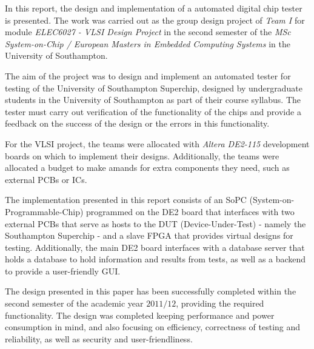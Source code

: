 In this report, the design and implementation of a automated digital chip tester is presented. The work was carried out as the group design project of \textit{Team I} for module \emph{ELEC6027 - VLSI Design Project} in the second semester of the \textit{MSc System-on-Chip / European Masters in Embedded Computing Systems} in the University of Southampton.

The aim of the project was to design and implement an automated tester for testing of the University of Southampton Superchip, designed by undergraduate students in the University of Southampton as part of their course syllabus. The tester must carry out verification of the functionality of the chips and provide a feedback on the success of the design or the errors in this functionality.

For the VLSI project, the teams were allocated with \textit{Altera DE2-115} development boards on which to implement their designs. Additionally, the teams were allocated a budget to make amands for extra components they need, such as external PCBs or ICs.

The implementation presented in this report consists of an SoPC (System-on-Programmable-Chip) programmed on the DE2 board that interfaces with two external PCBs that serve as hosts to the DUT (Device-Under-Test) - namely the Southampton Superchip - and a slave FPGA that provides virtual designs for testing. Additionally, the main DE2 board interfaces with a database server that holds a database to hold information and results from tests, as well as a backend to provide a user-friendly GUI.

The design presented in this paper has been successfully completed within the second semester of the academic year $2011/12$, providing the required functionality. The design was completed keeping performance and power consumption in mind, and also focusing on efficiency, correctness of testing and reliability, as well as security and user-friendliness.